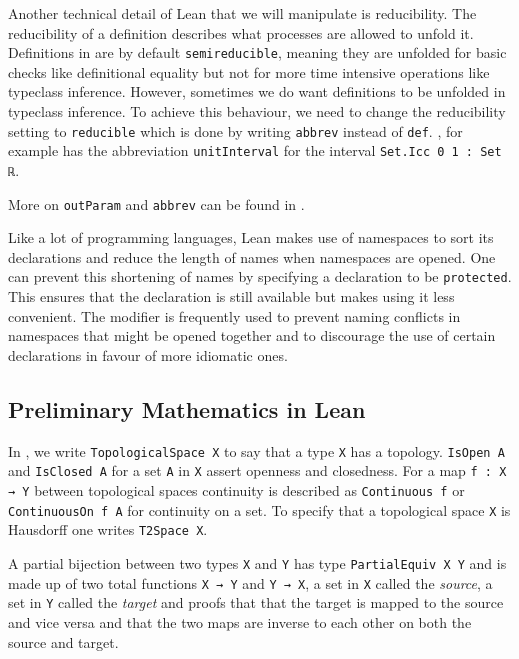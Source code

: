 Another technical detail of Lean that we will manipulate is reducibility.
The reducibility of a definition describes what processes are allowed to unfold it. 
Definitions in \mathlib are by default \lstinline|semireducible|, meaning they are unfolded for basic checks like definitional equality but not for more time intensive operations like typeclass inference.
However, sometimes we do want definitions to be unfolded in typeclass inference. 
To achieve this behaviour, we need to change the reducibility setting to \lstinline|reducible| which is done by writing \lstinline|abbrev| instead of \lstinline|def|. 
\mathlib, for example has the abbreviation \lstinline|unitInterval| for the interval \lstinline|Set.Icc 0 1 : Set ℝ|.

More on \lstinline|outParam| and \lstinline|abbrev| can be found in \cite{LeanReference2025}.

Like a lot of programming languages, Lean makes use of namespaces to sort its declarations and reduce the length of names when namespaces are opened. 
One can prevent this shortening of names by specifying a declaration to be \lstinline|protected|. 
This ensures that the declaration is still available but makes using it less convenient. 
The modifier is frequently used to prevent naming conflicts in namespaces that might be opened together and to discourage the use of certain declarations in favour of more idiomatic ones. 

\subsection{Preliminary Mathematics in Lean}\label{sub:mathinlean}

In \mathlib, we write \lstinline|TopologicalSpace X| to say that a type \lstinline|X| has a topology. 
\lstinline|IsOpen A| and \lstinline|IsClosed A| for a set \lstinline|A| in \lstinline|X| assert openness and closedness. 
For a map \lstinline|f : X → Y| between topological spaces continuity is described as \lstinline|Continuous f| or \lstinline|ContinuousOn f A| for continuity on a set. 
To specify that a topological space \lstinline|X| is Hausdorff one writes \lstinline|T2Space X|.

A partial bijection between two types \lstinline|X| and \lstinline|Y| has type \lstinline|PartialEquiv X Y| and is made up of two total functions \lstinline|X → Y| and \lstinline|Y → X|, a set in \lstinline|X| called the \emph{source}, a set in \lstinline|Y| called the \emph{target} and proofs that that the target is mapped to the source and vice versa and that the two maps are inverse to each other on both the source and target.

